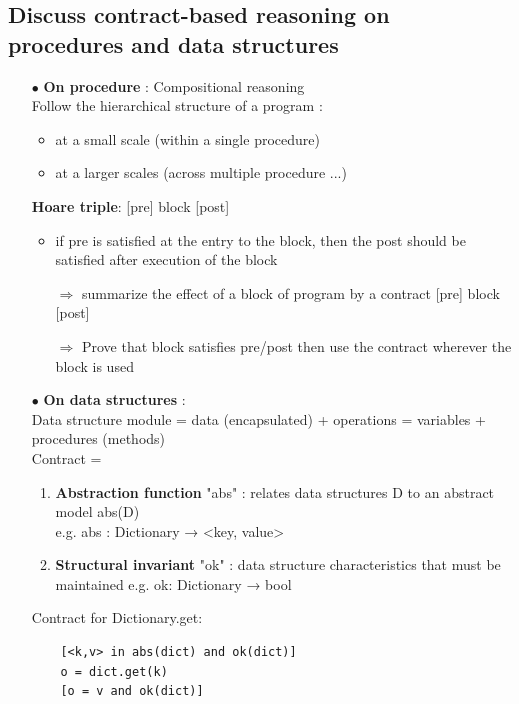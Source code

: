 \documentclass{article}
\begin{document}
\subsection{Discuss contract-based reasoning on procedures and data structures}
\begin{multicols}{2}
\begin{itemize}
    \item [$\bullet$]\textbf{On procedure} : Compositional reasoning\\
    Follow the hierarchical structure of a program :
    \begin{itemize}
        \item at a small scale (within a single procedure)
        \item at a larger scales (across multiple procedure ...)

    \end{itemize}
    \textbf{Hoare triple}: [pre] block [post]
    \begin{itemize}
        \item  if pre is satisfied at the entry to the block, then the post should be satisfied after execution of the block
        \item [$\Rightarrow$]summarize the effect of a block of program by a contract [pre] block [post]
        \item [$\Rightarrow$]Prove that block satisfies pre/post then use the contract wherever the block is used
    \end{itemize}

    \vfill\null\columnbreak
    \item [$\bullet$]\textbf{On data structures} :\\
    Data structure module = data (encapsulated) + operations = variables + procedures (methods)\\
    Contract = 
    \begin{enumerate}
        \item \textbf{Abstraction function} "abs" :
relates data structures D to an abstract model abs(D) \\e.g. abs : Dictionary → {<key, value>}
        \item \textbf{Structural invariant} "ok" : data structure characteristics that must be maintained e.g. ok: Dictionary → bool\\
    \end{enumerate}
    Contract for Dictionary.get:
    \begin{lstlisting}
    [<k,v> in abs(dict) and ok(dict)]
    o = dict.get(k)
    [o = v and ok(dict)]
    \end{lstlisting}
\end{itemize}
\end{multicols}
\end{document}
